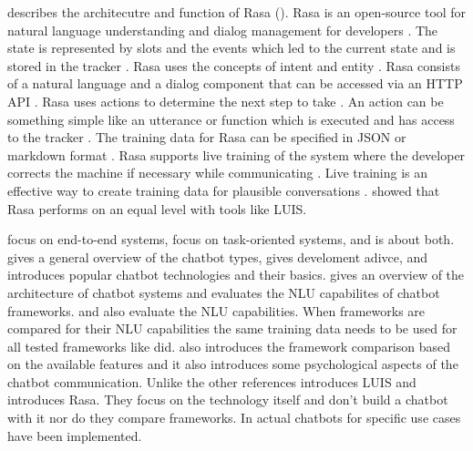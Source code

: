 \citet{rasabocklisch2017} describes the architecutre and function of Rasa (\citet{singhbuilding, braunEvaluatingNLU, buiildChatbotsPython}).
Rasa is an open-source tool for natural language understanding and dialog management for developers \cite{rasabocklisch2017}.
The state is represented by slots and the events which led to the current state and is stored in the tracker \cite{rasabocklisch2017}. 
Rasa uses the concepts of intent and entity \cite{rasabocklisch2017}. 
Rasa consists of a natural language and a dialog component that can be accessed via an HTTP API \cite{rasabocklisch2017}.
Rasa uses actions to determine the next step to take \cite{rasabocklisch2017}. 
An action can be something simple like an utterance or function which is executed and has access to the tracker \cite{rasabocklisch2017}.
The training data for Rasa can be specified in JSON or markdown format \cite{rasabocklisch2017}.
Rasa supports live training of the system where the developer corrects the machine if necessary while communicating \cite{rasabocklisch2017}.
Live training is an effective way to create training data for plausible conversations \cite{rasabocklisch2017}.
\citet{braunEvaluatingNLU} showed that Rasa performs on an equal level with tools like LUIS.

\citet{evaluateChatbotsShawar2007,bordes2016learning,williams2017hybrid} 
focus on end-to-end systems, \citet{braunEvaluatingNLU, dutta2017developing,luis2015williams,rasabocklisch2017,pharmacybot,gregori2017evaluation}
focus on task-oriented systems, and \citet{singhbuilding} is about both.
\citet{singhbuilding} gives a general overview of the chatbot types, gives develoment adivce, and introduces 
popular chatbot technologies and their basics.
\citet{braunEvaluatingNLU} gives an overview of the architecture of chatbot systems and 
evaluates the NLU capabilites of chatbot frameworks.
\citet{gregori2017evaluation} and \citet{dutta2017developing} also evaluate the NLU capabilities.
When frameworks are compared for their NLU capabilities the same training data needs to be used 
for all tested frameworks like \citet{braunEvaluatingNLU,gregori2017evaluation} did.
\citet{dutta2017developing} also introduces the framework comparison based on the available features
and it also introduces some psychological aspects of the chatbot communication.
Unlike the other references \citet{luis2015williams} introduces LUIS and \citet{rasabocklisch2017} 
introduces Rasa. 
They focus on the technology itself and don't build a chatbot with it nor do they compare frameworks.
In \citet{dutta2017developing, pharmacybot, PRZEGALINSKA2019785} actual chatbots for specific use cases have been implemented.


